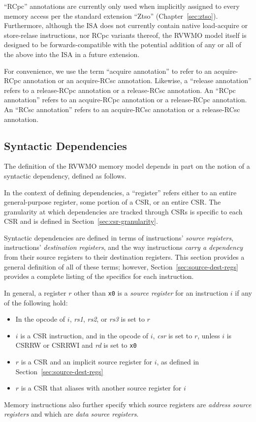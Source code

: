 \begin{commentary}
  ``RCpc'' annotations are currently only used when implicitly assigned to every memory access per the standard extension ``Ztso'' (Chapter~\ref{sec:ztso}).  Furthermore, although the ISA does not currently contain native load-acquire or store-relase instructions, nor RCpc variants thereof, the RVWMO model itself is designed to be forwards-compatible with the potential addition of any or all of the above into the ISA in a future extension.
\end{commentary}

For convenience, we use the term ``acquire annotation'' to refer to an acquire-RCpc annotation or an acquire-RCsc annotation.
Likewise, a ``release annotation'' refers to a release-RCpc annotation or a release-RCsc annotation.
An ``RCpc annotation'' refers to an acquire-RCpc annotation or a release-RCpc annotation.
An ``RCsc annotation'' refers to an acquire-RCsc annotation or a release-RCsc annotation.

\subsection*{Syntactic Dependencies}
\label{sec:memorymodel:dependencies}
The definition of the RVWMO memory model depends in part on the notion of a syntactic dependency, defined as follows.

In the context of defining dependencies, a ``register'' refers either to an entire general-purpose register, some portion of a CSR, or an entire CSR.  The granularity at which dependencies are tracked through CSRs is specific to each CSR and is defined in Section~\ref{sec:csr-granularity}.

Syntactic dependencies are defined in terms of instructions' {\em source registers}, instructions' {\em destination registers}, and the way instructions {\em carry a dependency} from their source registers to their destination registers.
This section provides a general definition of all of these terms; however, Section~\ref{sec:source-dest-regs} provides a complete listing of the specifics for each instruction.

In general, a register $r$ other than {\tt x0} is a {\em source register} for an instruction $i$ if any of the following hold:
\begin{itemize}
  \item In the opcode of $i$, {\em rs1}, {\em rs2}, or {\em rs3} is set to $r$
  \item $i$ is a CSR instruction, and in the opcode of $i$, {\em csr} is set to $r$, unless $i$ is CSRRW or CSRRWI and {\em rd} is set to {\tt x0}
  \item $r$ is a CSR and an implicit source register for $i$, as defined in Section~\ref{sec:source-dest-regs}
  \item $r$ is a CSR that aliases with another source register for $i$
\end{itemize}
Memory instructions also further specify which source registers are {\em address source registers} and which are {\em data source registers}.

